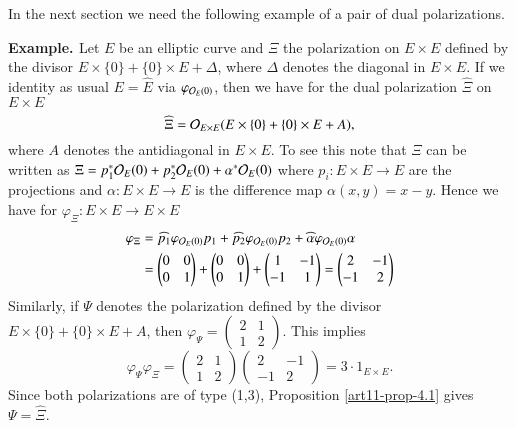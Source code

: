 In the next section we need the following example of a pair of dual polarizations.

\medskip
\noindent
{\bfseries {} Example. \label{art11-Exam-4.2}} Let $E$ be an elliptic curve and $\Xi$ the polarization on $E\times E$ defined by the divisor $E \times \{0\} + \{0\} \times E + \Delta$, where $\Delta$ denotes the diagonal in $E \times E$. If  we identity as usual $E =\hat{E}$ via $\varphi_{\mathcal{O}_{E}(0)}$, then we have for the dual polarization $\hat{\Xi}$ on $E \times E$
$$
\widehat{\Xi} = \mathcal{O}_{E \times E}(E \times \{0\} + \{0\} \times E +A),
$$
where $A$ denotes the antidiagonal in $E \times E$. To see this note that $\Xi$ can be written as $\Xi = p_{1}^{*}\mathcal{O}_{E}(0) + p_{2}^{*}\mathcal{O}_{E}(0) + \alpha^{*}\mathcal{O}_{E}(0)$ where $p_{i}: E \times E \rightarrow E $ are the projections and $\alpha : E \times E \rightarrow E$ is the difference map $\alpha(x,y) = x-y$. Hence we have
for $\varphi_{\Xi}: E \times E \rightarrow E \times E$
\begin{align*}
\varphi_{\Xi} &= \widehat{p_{1}}\varphi_{\mathcal{O}_{E} (0)}p_{1} + \widehat{p_{2}}\varphi_{\mathcal{O}_{E}(0)}p_{2} +
\widehat{\alpha}\varphi_{\mathcal{O}_{E}(0)}\alpha\\
 & =\begin{pmatrix}
0 & 0\\
0 & 1
\end{pmatrix}
+
\begin{pmatrix}
0 & 0\\
0 & 1
\end{pmatrix}
+
\begin{pmatrix}
1 & -1\\
-1 & 1
\end{pmatrix}
=
\begin{pmatrix}
2 & -1\\
-1 & 2
\end{pmatrix}
\end{align*}
Similarly, if $\Psi$ denotes the polarization defined by the divisor $E \times \{0\} + \{0\} \times E + A$, then 
$\varphi_{\Psi} = \begin{pmatrix}
2 & 1\\
1 & 2
\end{pmatrix}$.
This implies
$$
\varphi_{\Psi}\varphi_{\Xi} = \begin{pmatrix}
2 & 1\\
1 & 2
\end{pmatrix}
\begin{pmatrix}
2 & -1\\
-1 & 2
\end{pmatrix}
=3 \cdot 1_{E\times E}.
$$
Since both polarizations are of type (1,3), Proposition \ref{art11-prop-4.1} gives $\Psi = \widehat{\Xi}$.

